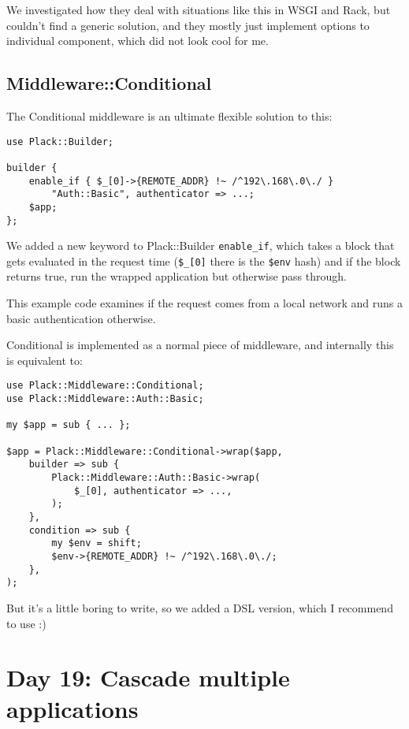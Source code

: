 We investigated how they deal with situations like this in WSGI and
Rack, but couldn't find a generic solution, and they mostly just
implement options to individual component, which did not look cool for
me.

\subsection{Middleware::Conditional}\label{middlewareconditional}

The Conditional middleware is an ultimate flexible solution to this:

\begin{lstlisting}
use Plack::Builder;

builder {
    enable_if { $_[0]->{REMOTE_ADDR} !~ /^192\.168\.0\./ }
        "Auth::Basic", authenticator => ...;
    $app;
};
\end{lstlisting}

We added a new keyword to Plack::Builder \lstinline!enable_if!, which
takes a block that gets evaluated in the request time (\lstinline!$_[0]!
there is the \lstinline!$env! hash) and if the block returns true, run
the wrapped application but otherwise pass through.

This example code examines if the request comes from a local network and
runs a basic authentication otherwise.

Conditional is implemented as a normal piece of middleware, and
internally this is equivalent to:

\begin{lstlisting}
use Plack::Middleware::Conditional;
use Plack::Middleware::Auth::Basic;

my $app = sub { ... };

$app = Plack::Middleware::Conditional->wrap($app,
    builder => sub {
        Plack::Middleware::Auth::Basic->wrap(
            $_[0], authenticator => ...,
        );
    },
    condition => sub {
        my $env = shift;
        $env->{REMOTE_ADDR} !~ /^192\.168\.0\./;
    },
);
\end{lstlisting}

But it's a little boring to write, so we added a DSL version, which I
recommend to use :)

\section{Day 19: Cascade multiple
applications}\label{day-19-cascade-multiple-applications}

